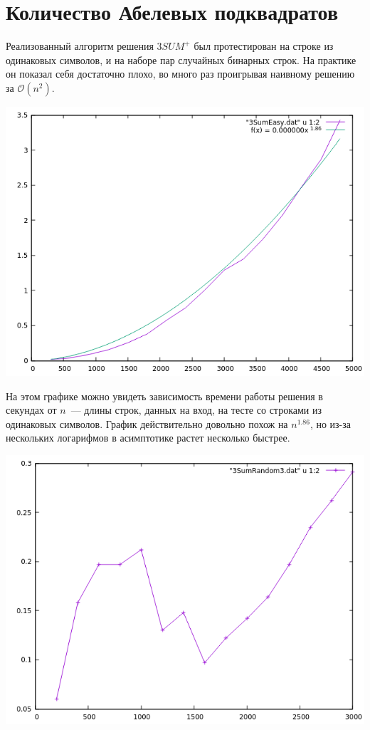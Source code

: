 \section{Количество Абелевых подквадратов}

Реализованный алгоритм решения $3SUM^+$ был протестирован на строке из одинаковых символов, и на наборе пар случайных бинарных строк. На практике он показал себя достаточно плохо, во много раз проигрывая наивному решению за $\mathcal{O}(n^2)$.

\includegraphics[scale=1]{pics/4.png}

На этом графике можно увидеть зависимость времени работы решения в секундах от $n$~--- длины строк, данных на вход, на тесте со строками из одинаковых символов. График действительно довольно похож на $n^{1.86}$, но из-за нескольких логарифмов в асимптотике растет несколько быстрее. 

\includegraphics[scale=1]{pics/5.png}

